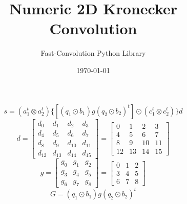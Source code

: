 \documentclass{article}%
\title{Numeric 2D Kronecker Convolution}%
\author{Fast{-}Convolution Python Library}%
\date{\today}%
\begin{document}
%
\normalsize%
\maketitle%
\[%
s=(a_1^t \otimes a_2^t) \{[(q_1 \odot b_1) g (q_2 \odot b_2)^t] \odot (c_1^t \otimes c_2^t)\} d%
\]%
\[%
d = \left[\begin{matrix}d_{0} & d_{1} & d_{2} & d_{3}\\d_{4} & d_{5} & d_{6} & d_{7}\\d_{8} & d_{9} & d_{10} & d_{11}\\d_{12} & d_{13} & d_{14} & d_{15}\end{matrix}\right] = \left[\begin{matrix}0 & 1 & 2 & 3\\4 & 5 & 6 & 7\\8 & 9 & 10 & 11\\12 & 13 & 14 & 15\end{matrix}\right]%
\]%
\[%
g = \left[\begin{matrix}g_{0} & g_{1} & g_{2}\\g_{3} & g_{4} & g_{5}\\g_{6} & g_{7} & g_{8}\end{matrix}\right] = \left[\begin{matrix}0 & 1 & 2\\3 & 4 & 5\\6 & 7 & 8\end{matrix}\right]%
\]%
\[%
G = (q_1 \odot b_1) g (q_2 \odot b_2)^t%
\]%
\end{document}
